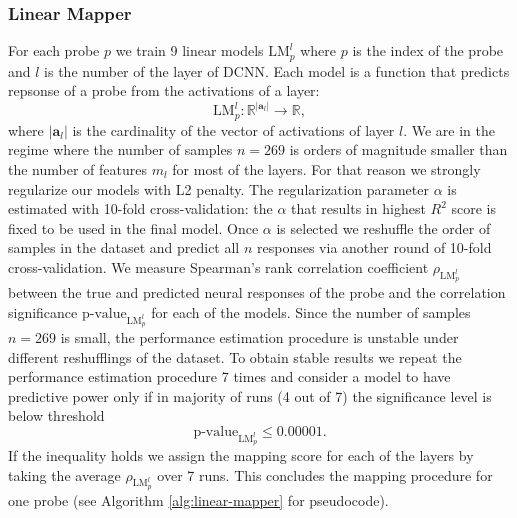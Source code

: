 \documentclass[final]{jneurosci}
\begin{document}
\subsubsection{Linear Mapper}
For each probe $p$ we train 9 linear models $\text{LM}^l_p$ where $p$ is the index of the probe and $l$ is the number of the layer of DCNN. Each model is a function that predicts repsonse of a probe from the activations of a layer:
$$\text{LM}^l_p: \mathbb{R}^{|\mathbf{a}_l|} \rightarrow \mathbb{R},$$
where $|\mathbf{a}_l|$ is the cardinality of the vector of activations of layer $l$. We are in the regime where the number of samples $n=269$ is orders of magnitude smaller than the number of features $m_l$ for most of the layers. For that reason we strongly regularize our models with L2 penalty. The regularization parameter $\alpha$ is estimated with 10-fold cross-validation: the $\alpha$ that results in highest $R^2$ score is fixed to be used in the final model. Once $\alpha$ is selected we reshuffle the order of samples in the dataset and predict all $n$ responses via another round of 10-fold cross-validation. We measure Spearman's rank correlation coefficient $\rho_{\text{LM}^l_p}$ between the true and predicted neural responses of the probe and the correlation significance $\text{p-value}_{\text{LM}^l_p}$ for each of the models. Since the number of samples $n=269$ is small, the performance estimation procedure is unstable under different reshufflings of the dataset. To obtain stable results we repeat the performance estimation procedure 7 times and consider a model to have predictive power only if in majority of runs (4 out of 7) the significance level is below threshold $$\text{p-value}_{\text{LM}^l_p} \leq 0.00001.$$ If the inequality holds we assign the mapping score for each of the layers by taking the average $\rho_{\text{LM}^l_p}$ over 7 runs. This concludes the mapping procedure for one probe (see Algorithm \ref{alg:linear-mapper} for pseudocode).
\end{document}
